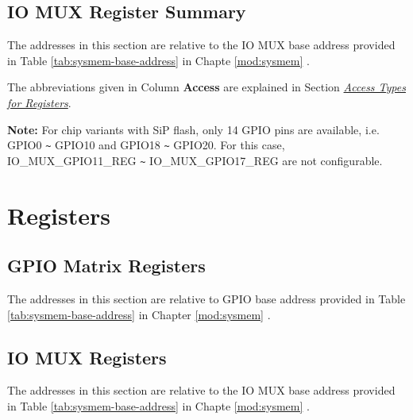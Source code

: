 \documentclass[main\_\_EN.tex]{subfiles}
\begin{document}
\label{section:4.12}




\subsection{IO MUX Register Summary}
The addresses in this section are relative to the IO MUX base address provided in Table \ref{tab:sysmem-base-address} in Chapte \ref{mod:sysmem} \textit{} .

The abbreviations given in Column \textbf{Access} are explained in Section \hyperref[glossary-access-types]{\textit{Access Types for Registers}}.

\textbf{Note:} For chip variants with SiP flash, only 14 GPIO pins are available, i.e. GPIO0 \verb+~+ GPIO10 and GPIO18 \verb+~+ GPIO20. For this case, IO\_MUX\_GPIO11\_REG \verb+~+ IO\_MUX\_GPIO17\_REG are not configurable.



\section{Registers}

\subsection{GPIO Matrix Registers}
The addresses in this section are relative to GPIO base address provided in Table \ref{tab:sysmem-base-address} in Chapter \ref{mod:sysmem} \textit{}.


\subsection{IO MUX Registers}
The addresses in this section are relative to the IO MUX base address provided in Table \ref{tab:sysmem-base-address} in Chapte \ref{mod:sysmem} \textit{} .

\end{document}
